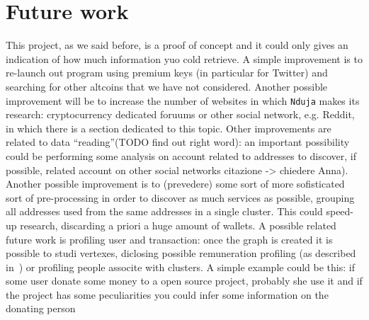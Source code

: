 \section{Future work}
This project, as we said before, is a proof of concept and it could only gives
an indication of how much information yuo cold retrieve. A simple improvement
is to re-launch out program using premium keys (in particular for Twitter) and
searching for other altcoins that we have not considered. Another possible
improvement will be to increase the number of websites in which \texttt{Nduja}
makes its research: cryptocurrency dedicated foruums or other social network,
e.g. Reddit, in which there is a section dedicated to this topic. Other
improvements are related to data ``reading''(TODO find out right word): an
important possibility could be performing some analysis on account related to
addresses to discover, if possible, related account on other social networks 
citazione -> chiedere Anna). Another possible improvement is to (prevedere)
some sort of more sofisticated sort of pre-processing in order to discover as
much services as possible, grouping all addresses used from the same addresses
in a single cluster. This could speed-up research, discarding a priori a huge
amount of wallets. A possible related future work is profiling user and
transaction: once the graph is created it is possible to studi vertexes,
diclosing possible remuneration profiling (as described in~\cite{fullDiscl}) or
profiling people associte with clusters. A simple example could be this: if
some user donate some money to a open source project, probably she use it and
if the project has some peculiarities you could infer some information on the
donating person
